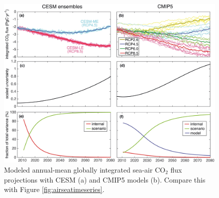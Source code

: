 \documentclass[a4paper]{article}
\begin{document}
\begin{enumerate}
\begin{figure}[H]   %
   \centering
   \includegraphics[trim=0 760 0 0,clip,scale=0.3]{Lovenduski16_GBC_Fig2.jpg}
   \caption[]{Modeled annual-mean globally integrated sea-air $\mathrm{CO_2}$ flux projections \citep{Lovenduski16} with CESM (a) and CMIP5 models (b). Compare this with Figure \ref{fig:airseatimeseries}.}
   \label{fig:airseatimeseries_cmip5}
\end{figure}

\end{enumerate}


\clearpage
 

\end{document}
